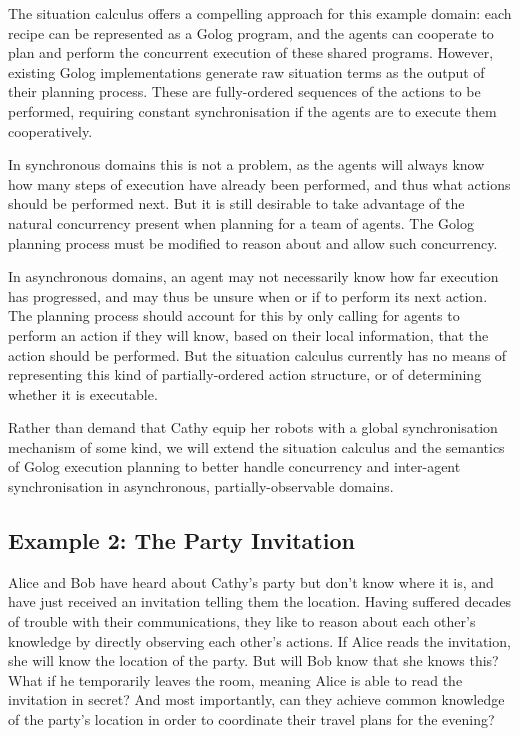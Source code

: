 The situation calculus offers a compelling approach for this example
domain: each recipe can be represented as a Golog program, and the
agents can cooperate to plan and perform the concurrent execution
of these shared programs. However, existing Golog implementations
generate raw situation terms as the output of their planning process.
These are fully-ordered sequences of the actions to be performed,
requiring constant synchronisation if the agents are to execute them
cooperatively.

In synchronous domains this is not a problem, as the agents will always
know how many steps of execution have already been performed, and
thus what actions should be performed next. But it is still desirable
to take advantage of the natural concurrency present when planning
for a team of agents. The Golog planning process must be modified
to reason about and allow such concurrency.

In asynchronous domains, an agent may not necessarily know how far
execution has progressed, and may thus be unsure when or if to perform
its next action. The planning process should account for this by only
calling for agents to perform an action if they will know, based on
their local information, that the action should be performed. But
the situation calculus currently has no means of representing this
kind of partially-ordered action structure, or of determining whether
it is executable.

Rather than demand that Cathy equip her robots with a global synchronisation
mechanism of some kind, we will extend the situation calculus and
the semantics of Golog execution planning to better handle concurrency
and inter-agent synchronisation in asynchronous, partially-observable
domains.


\subsection*{Example 2: The Party Invitation}

Alice and Bob have heard about Cathy's party but don't know where
it is, and have just received an invitation telling them the location.
Having suffered decades of trouble with their communications, they
like to reason about each other's knowledge by directly observing
each other's actions. If Alice reads the invitation, she will know
the location of the party. But will Bob know that she knows this?
What if he temporarily leaves the room, meaning Alice is able to read
the invitation in secret? And most importantly, can they achieve common
knowledge of the party's location in order to coordinate their travel
plans for the evening?\\


